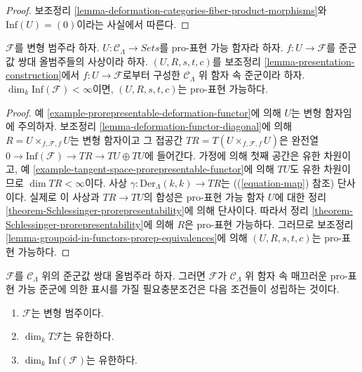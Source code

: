 \begin{proof}
보조정리 \ref{lemma-deformation-categories-fiber-product-morphisms}와
$\text{Inf}(U) = (0)$이라는 사실에서 따른다.
\end{proof}

\begin{lemma}
\label{lemma-prorepresentable-groupoid-in-functors-construction}
$\mathcal{F}$를 변형 범주라 하자.
$U : \mathcal{C}_\Lambda \to \textit{Sets}$를 pro-표현 가능 함자라 하자.
$f : U \to \mathcal{F}$를 준군값 쌍대 올범주들의 사상이라 하자.
$(U, R, s, t, c)$를 보조정리
\ref{lemma-presentation-construction}에서 $f : U \to \mathcal{F}$로부터
구성한 $\mathcal{C}_\Lambda$ 위 함자 속 준군이라 하자.
$\dim_k \text{Inf}(\mathcal{F}) < \infty$이면,
$(U, R, s, t, c)$는 pro-표현 가능하다.
\end{lemma}

\begin{proof}
예 \ref{example-prorepresentable-deformation-functor}에 의해
$U$는 변형 함자임에 주의하자. 보조정리
\ref{lemma-deformation-functor-diagonal}에 의해
$R = U \times_{f, \mathcal{F}, f} U$는 변형 함자이고 그 접공간
$TR = T(U \times_{f, \mathcal{F}, f} U)$은 완전열
$0 \to \text{Inf}(\mathcal{F}) \to TR \to TU \oplus TU$에 들어간다.
가정에 의해 첫째 공간은 유한 차원이고, 예
\ref{example-tangent-space-prorepresentable-functor}에 의해
$TU$도 유한 차원이므로 $\dim TR < \infty$이다.
사상 $\gamma : \text{Der}_\Lambda(k, k) \to TR$는
((\ref{equation-map}) 참조) 단사이다. 실제로 이 사상과
$TR \to TU$의 합성은 pro-표현 가능 함자 $U$에 대한 정리
\ref{theorem-Schlessinger-prorepresentability}에 의해 단사이다.
따라서 정리 \ref{theorem-Schlessinger-prorepresentability}에 의해
$R$은 pro-표현 가능하다. 그러므로 보조정리
\ref{lemma-groupoid-in-functors-prorep-equivalences}에 의해
$(U, R, s, t, c)$는 pro-표현 가능하다.
\end{proof}

\begin{theorem}
\label{theorem-presentation-deformation-groupoid}
$\mathcal{F}$를 $\mathcal{C}_\Lambda$ 위의 준군값 쌍대 올범주라 하자.
그러면 $\mathcal{F}$가 $\mathcal{C}_\Lambda$ 위 함자 속
매끄러운 pro-표현 가능 준군에 의한 표시를 가질 필요충분조건은
다음 조건들이 성립하는 것이다.
\begin{enumerate}
\item $\mathcal{F}$는 변형 범주이다.
\item $\dim_k T\mathcal{F}$는 유한하다.
\item $\dim_k \text{Inf}(\mathcal{F})$는 유한하다.
\end{enumerate}
\end{theorem}

